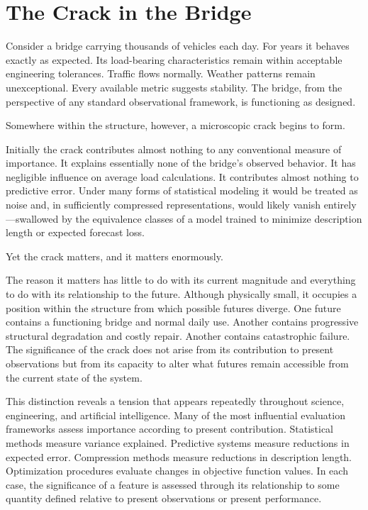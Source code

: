 \documentclass[12pt,a4paper]{article}
\theoremstyle{plain}
\theoremstyle{definition}
\theoremstyle{remark}
\begin{document}
\bigskip

\section{The Crack in the Bridge}

Consider a bridge carrying thousands of vehicles each day. For years it
behaves exactly as expected. Its load-bearing characteristics remain within
acceptable engineering tolerances. Traffic flows normally. Weather patterns
remain unexceptional. Every available metric suggests stability. The bridge,
from the perspective of any standard observational framework, is functioning
as designed.

Somewhere within the structure, however, a microscopic crack begins to form.

Initially the crack contributes almost nothing to any conventional measure of
importance. It explains essentially none of the bridge's observed behavior.
It has negligible influence on average load calculations. It contributes
almost nothing to predictive error. Under many forms of statistical modeling
it would be treated as noise and, in sufficiently compressed representations,
would likely vanish entirely---swallowed by the equivalence classes of a
model trained to minimize description length or expected forecast loss.

Yet the crack matters, and it matters enormously.

The reason it matters has little to do with its current magnitude and
everything to do with its relationship to the future. Although physically
small, it occupies a position within the structure from which possible
futures diverge. One future contains a functioning bridge and normal daily
use. Another contains progressive structural degradation and costly repair.
Another contains catastrophic failure. The significance of the crack does not
arise from its contribution to present observations but from its capacity to
alter what futures remain accessible from the current state of the system.

This distinction reveals a tension that appears repeatedly throughout
science, engineering, and artificial intelligence. Many of the most
influential evaluation frameworks assess importance according to present
contribution. Statistical methods measure variance explained. Predictive
systems measure reductions in expected error. Compression methods measure
reductions in description length. Optimization procedures evaluate changes in
objective function values. In each case, the significance of a feature is
assessed through its relationship to some quantity defined relative to
present observations or present performance.
\end{document}
